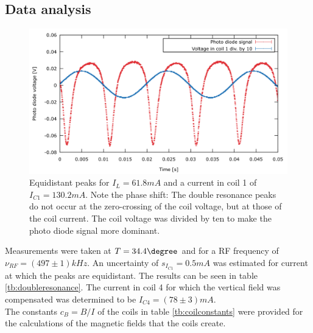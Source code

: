 \subsection{Data analysis}
\begin{figure}
\centering
\includegraphics[width=1.0\linewidth]{graphics/equaldistance}
\caption[Double resonance peaks]{Equidistant peaks for $I_L=\unit{61.8}{mA}$ and a current in coil 1 of $I_{C1}=\unit{130.2}{mA}$. Note the phase shift: The double resonance peaks do not occur at the zero-crossing of the coil voltage, but at those of the coil current. The coil voltage was divided by ten to make the photo diode signal more dominant.}
\label{fig:equaldistance}
\end{figure}
Measurements were taken at $T=\unit{34.4}{\degree}$ and for a RF frequency of $\nu_{RF}=\unit{(497\pm1)}{kHz}$. An uncertainty of $s_{I_{C1}}=\unit{0.5}{mA}$ was estimated for current at which the peaks are equidistant. The results can be seen in table \ref{tb:doubleresonance}. The current in coil 4 for which the vertical field was compensated was determined to be $I_{C4}=\unit{(78\pm3)}{mA}$.\\
The constants $c_B=B/I$ of the coils in table \ref{tb:coilconstants} were provided \cite{anleitung} for the calculations of the magnetic fields that the coils create.

